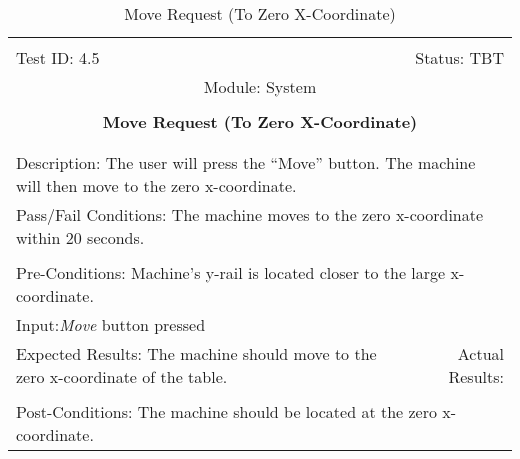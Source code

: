 \documentclass[titlepage]{article}
\begin{document}
\begin{center}%
\begin{table}[h!]
\begin{tabular}{|l r|}\hline&\\[-2mm]
	Test ID: 4.5	&Status: TBT\\[-3mm]
	\multicolumn{2}{|c|}{Module: System}\\&\\
	\multicolumn{2}{|c|}{\textbf{\large{Move Request (To Zero X-Coordinate)}}}\\&\\\hline&\\[-3mm]
	\multicolumn{2}{|p{\textwidth}|}{Description: The user will press the ``Move'' button. The machine will then move to the zero x-coordinate.}\\\hline
	\multicolumn{2}{|p{\textwidth}|}{Pass/Fail Conditions: The machine moves to the zero x-coordinate within 20 seconds.}\\[1mm]\hline&\\[-3mm]
	\multicolumn{2}{|p{\textwidth}|}{Pre-Conditions: Machine's y-rail is located closer to the large x-coordinate.}\\[4mm]
	\multicolumn{2}{|p{\textwidth}|}{Input:\newline\textit{Move} button pressed}\\[2mm]\hline
	\multicolumn{1}{|p{0.49\textwidth}}{Expected Results: The machine should move to the zero x-coordinate of the table.}	&\multicolumn{1}{|p{0.45\textwidth}|}{Actual Results: }\\\hline&\\[-3mm]
	\multicolumn{2}{|p{\textwidth}|}{Post-Conditions: The machine should be located at the zero x-coordinate.}\\\hline
\end{tabular}
\caption{Move Request (To Zero X-Coordinate)}
\end{table}
\end{center}
\end{document}

